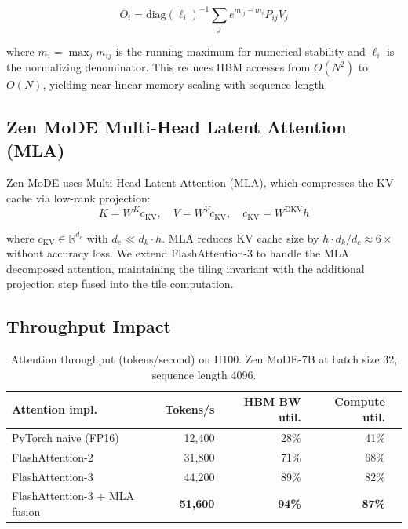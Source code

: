 \documentclass[11pt,a4paper]{article}
\begin{document}
\begin{equation}
    O_i = \text{diag}(\ell_i)^{-1} \sum_j e^{m_{ij} - m_i} P_{ij} V_j
    \label{eq:fa3_output}
\end{equation}

where $m_i = \max_j m_{ij}$ is the running maximum for numerical stability and $\ell_i$
is the normalizing denominator. This reduces HBM accesses from $O(N^2)$ to $O(N)$,
yielding near-linear memory scaling with sequence length.

\subsection{Zen MoDE Multi-Head Latent Attention (MLA)}

Zen MoDE uses Multi-Head Latent Attention (MLA), which compresses the KV cache via
low-rank projection:
\begin{equation}
    K = W^K c_{\text{KV}}, \quad V = W^V c_{\text{KV}}, \quad
    c_{\text{KV}} = W^{\text{DKV}} h
    \label{eq:mla}
\end{equation}

where $c_{\text{KV}} \in \mathbb{R}^{d_c}$ with $d_c \ll d_k \cdot h$. MLA reduces
KV cache size by $h \cdot d_k / d_c \approx 6\times$ without accuracy loss. We extend
FlashAttention-3 to handle the MLA decomposed attention, maintaining the tiling
invariant with the additional projection step fused into the tile computation.

\subsection{Throughput Impact}

\begin{table}[H]
\centering
\caption{Attention throughput (tokens/second) on H100. Zen MoDE-7B at batch size 32,
sequence length 4096.}
\begin{tabular}{lrrrr}
\toprule
\textbf{Attention impl.} & \textbf{Tokens/s} & \textbf{HBM BW util.} & \textbf{Compute util.} \\
\midrule
PyTorch naive (FP16)          & 12,400 & 28\% & 41\% \\
FlashAttention-2              & 31,800 & 71\% & 68\% \\
FlashAttention-3              & 44,200 & 89\% & 82\% \\
FlashAttention-3 + MLA fusion & \textbf{51,600} & \textbf{94\%} & \textbf{87\%} \\
\bottomrule
\end{tabular}
\label{tab:fa_throughput}
\end{table}
\end{document}
